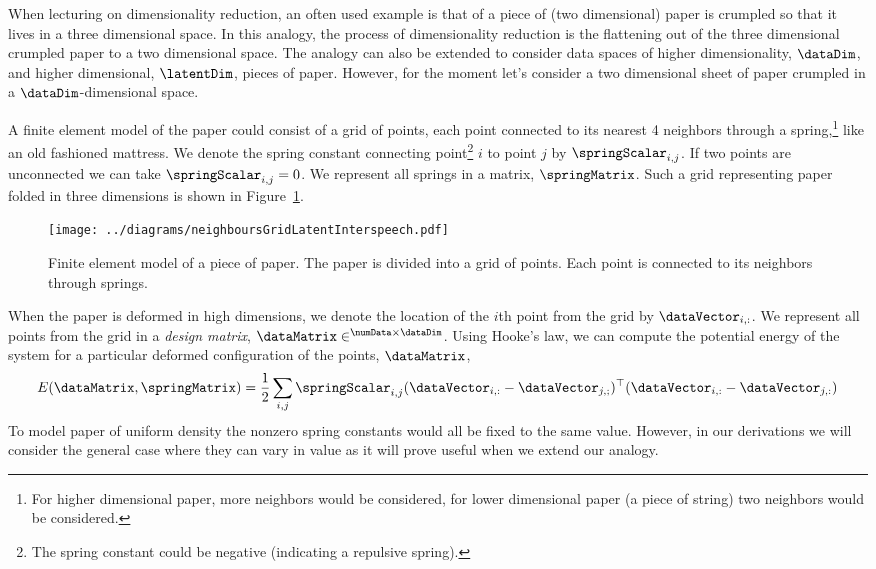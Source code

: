 When lecturing on dimensionality reduction, an often used example is
that of a piece of (two dimensional) paper is crumpled so that it
lives in a three dimensional space. In this analogy, the process of
dimensionality reduction is the flattening out of the three
dimensional crumpled paper to a two dimensional space. The analogy can
also be extended to consider data spaces of higher dimensionality,
$\dataDim$, and higher dimensional, $\latentDim$, pieces of
paper. However, for the moment let's consider a two dimensional sheet
of paper crumpled in a $\dataDim$-dimensional space. 

A finite element model of the paper could consist of a grid of points,
each point connected to its nearest 4 neighbors through a
spring,\footnote{For higher dimensional paper, more neighbors would be
  considered, for lower dimensional paper (a piece of string) two
  neighbors would be considered.} like an old fashioned mattress. We
denote the spring constant connecting point\footnote{The spring
  constant could be negative (indicating a repulsive spring).}  $i$ to
point $j$ by $\springScalar_{i,j}$. If two points are unconnected we
can take $\springScalar_{i,j}=0$. We represent all springs in a
matrix, $\springMatrix$. Such a grid representing paper folded in
three dimensions is shown in Figure~\ref{fig:neighboursGridData}.
\begin{figure}
  \texttt{[image: ../diagrams/neighboursGridLatentInterspeech.pdf]}
  \caption{Finite element model of a piece of paper. The paper is
    divided into a grid of points. Each point is connected to its
    neighbors through springs.}\label{fig:neighboursGridData}
\end{figure}

When the paper is deformed in high dimensions, we denote the location
of the $i$th point from the grid by $\dataVector_{i, :}$. We represent
all points from the grid in a \emph{design matrix},
$\dataMatrix\in^{\numData\times\dataDim}$. Using Hooke's law, we can
compute the potential energy of the system for a particular deformed
configuration of the points, $\dataMatrix$,
\[
E(\dataMatrix, \springMatrix) = \frac{1}{2}\sum_{i,j}
\springScalar_{i,j}(\dataVector_{i,:} -
\dataVector_{j,;})^\top(\dataVector_{i,:} - \dataVector_{j,:})
\]
To model paper of uniform density the nonzero spring constants would
all be fixed to the same value. However, in our derivations we will
consider the general case where they can vary in value as it will
prove useful when we extend our analogy.

